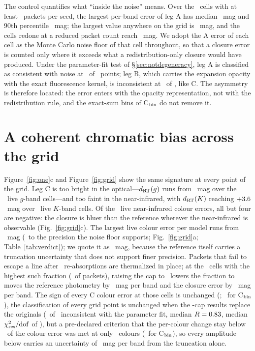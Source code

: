 \documentclass[11pt]{article}
\newcommand{\Cboth}{C\xspace}
\newcommand{\Cbin}{C$_{\rm bin}$\xspace}
\newcommand{\Aleg}{A\xspace}
\newcommand{\Bleg}{B\xspace}
\newcommand{\dRT}{d_{\rm RT}}
\newcommand{\chires}{\chi^2_{\rm res}/{\rm dof}}
\begin{document}
The control quantifies what ``inside the noise'' means. Over the \FloorNWell\ cells with at least \FloorNMin\ packets per seed, the largest per-band error of leg \Aleg has median \FloorMedian\ mag and 90th percentile \FloorNinety\ mag; the largest value anywhere on the grid is \FloorMax\ mag, and the cells redone at a reduced packet count reach \FloorRedoneRange\ mag. We adopt the \Aleg error of each cell as the Monte Carlo noise floor of that cell throughout, so that a closure error is counted only where it exceeds what a redistribution-only closure would have produced. Under the parameter-fit test of \S\ref{sec:notdegeneracy}, leg \Aleg is classified as consistent with noise at \ControlCC\ of \ControlN\ points; leg \Bleg, which carries the expansion opacity with the exact fluorescence kernel, is inconsistent at \BOpacityCB\ of \ControlN, like \Cboth. The asymmetry is therefore located: the error enters with the opacity representation, not with the redistribution rule, and the exact-sum bins of \Cbin do not remove it.

\section{A coherent chromatic bias across the grid}\label{sec:bias}

Figure~\ref{fig:one}c and Figure~\ref{fig:grid} show the same signature at every point of the grid. Leg \Cboth is too bright in the optical---$\dRT(g)$ runs from \gDmRange\ mag over the \gN\ live $g$-band cells---and too faint in the near-infrared, with $\dRT(K)$ reaching $+3.6$~mag over \KN\ live $K$-band cells. Of the \NIRNegative\ live near-infrared colour errors, all but four are negative: the closure is bluer than the reference wherever the near-infrared is observable (Fig.~\ref{fig:grid}c). The largest live colour error per model runs from \WorstColourRange\ mag (\WorstColourRangeCoarse\ to the precision the noise floor supports; Fig.~\ref{fig:grid}a; Table~\ref{tab:verdict}); we quote it as \HeadlineColourRange\ mag, because the reference itself carries a truncation uncertainty that does not support finer precision. Packets that fail to escape a line after \ChainBase\ re-absorptions are thermalized in place; at the \ChainCells\ cells with the highest such fraction (\ChainTrapped\ of packets), raising the cap to \ChainTop\ lowers the fraction to \ChainTrappedTop\, moves the reference photometry by \ChainDmRefChange\ mag per band and the closure error by \ChainDmChange\ mag per band. The sign of every \Cboth colour error at those cells is unchanged (\ChainSigns; \ChainBinnedSigns\ for \Cbin), the classification of every grid point is unchanged when the \ChainTop-cap results replace the originals (\ChainCB\ of \ChainN\ inconsistent with the parameter fit, median $R=0.83$, median $\chires$ of \ChainMedianChi), but a pre-declared criterion that the per-colour change stay below \ChainRelMax\ of the colour error was met at only \ChainCriterion\ colours (\ChainBinnedCriterion\ for \Cbin), so every amplitude below carries an uncertainty of \ChainDmChange\ mag per band from the truncation alone.
\end{document}
